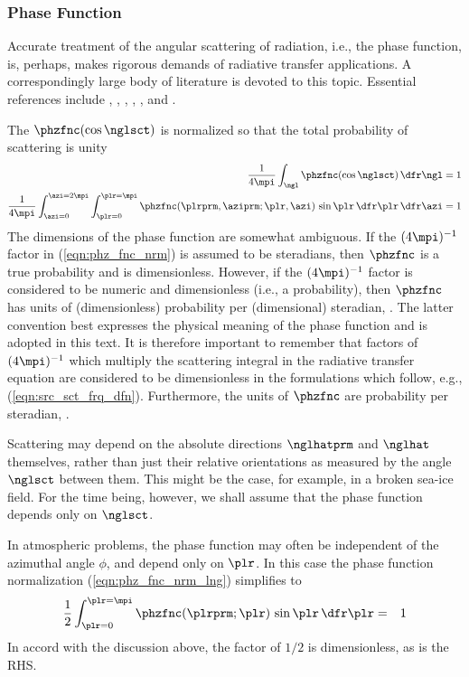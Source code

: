\documentclass[12pt]{article}
\begin{document}
\subsubsection[Phase Function]{Phase Function}\label{sxn:phz_fnc}
Accurate treatment of the angular scattering of radiation, i.e., the
phase function, is, perhaps, makes rigorous demands of radiative
transfer applications.
A correspondingly large body of literature is devoted to this topic.
Essential references include \citet{Van57}, \citet{JWW76},
\citet{WiG76}, \citet{Wis771}, \citet{Wis79}, and \citet{Bou98}.

The  $\phzfnc(\cos \nglsct)$ is normalized so
that the total probability of scattering is unity
\begin{subequations}
\label{eqn:phz_fnc_nrm}
\begin{align}
\label{eqn:phz_fnc_nrm_sht}
\frac{1}{4\mpi} \int_{\ngl} \phzfnc(\cos \nglsct) \,\dfr\ngl & = 1 \\
\label{eqn:phz_fnc_nrm_lng}
\frac{1}{4\mpi} \int_{\azi = 0}^{\azi = 2\mpi} 
\int_{\plr = 0}^{\plr = \mpi} 
\phzfnc(\plrprm,\aziprm;\plr,\azi) \, \sin \plr \,\dfr\plr
 \,\dfr\azi
& = 1
\end{align}
\end{subequations}
The dimensions of the phase function are somewhat ambiguous.
If the $(4\mpi)^{-1}$ factor in (\ref{eqn:phz_fnc_nrm}) is assumed
to be steradians, then $\phzfnc$ is a true probability and is
dimensionless. 
However, if the $(4\mpi)^{-1}$ factor is considered to be numeric
and dimensionless (i.e., a probability), then $\phzfnc$ has units
of (dimensionless) probability per (dimensional) steradian, \xsr.
The latter convention best expresses the physical meaning of the
phase function and is adopted in this text.
It is therefore important to remember that factors of $(4\mpi)^{-1}$ 
which multiply the scattering integral in the radiative transfer
equation are considered to be dimensionless in the formulations
which follow, e.g., (\ref{eqn:src_sct_frq_dfn}).
Furthermore, the units of $\phzfnc$ are probability per steradian,
\xsr.  

Scattering may depend on the absolute directions $\nglhatprm$ and
$\nglhat$ themselves, rather than just their relative orientations as
measured by the angle $\nglsct$ between them.  
This might be the case, for example, in a broken sea-ice field.
For the time being, however, we shall assume that the phase function
depends only on $\nglsct$.

In atmospheric problems, the phase function may often be independent
of the azimuthal angle $\phi$, and depend only on $\plr$.
In this case the phase function normalization
(\ref{eqn:phz_fnc_nrm_lng}) simplifies to 
\begin{eqnarray}
\label{eqn:phz_fnc_nrm_plr}
\frac{1}{2}
\int_{\plr = 0}^{\plr = \mpi} 
\phzfnc(\plrprm;\plr) \, \sin \plr \,\dfr\plr
& = & 1
\end{eqnarray}
In accord with the discussion above, the factor of $1/2$ is
dimensionless, as is the RHS. 
\end{document}
